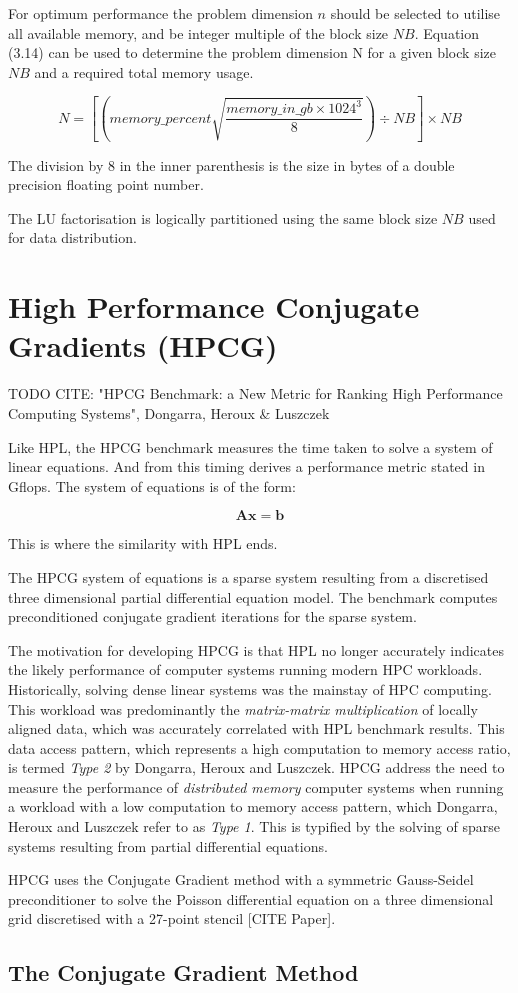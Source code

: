 For optimum performance the problem dimension $n$ should be selected to utilise all available memory, and be integer multiple of the block size $NB$. Equation (3.14) can be used to determine the problem dimension N for a given block size $NB$ and a required total memory usage.

\begin{equation}
N = \left[\left(memory\_percent \sqrt{\frac{memory\_in\_gb \times 1024^3}{8}}\right) \div NB\right] \times NB
\end{equation}

The division by 8 in the inner parenthesis is the size in bytes of a double precision floating point number.

The LU factorisation is logically partitioned using the same block size $NB$ used for data distribution.


%
%
\section{High Performance Conjugate Gradients (HPCG)}

TODO CITE: "HPCG Benchmark: a New Metric for Ranking High Performance Computing Systems", Dongarra, Heroux \& Luszczek

Like HPL, the HPCG benchmark measures the time taken to solve a system of linear equations. And from this timing derives a performance metric stated in Gflops. The system of equations is of the form:

\begin{equation}
\mathbf{Ax} = \mathbf{b}
\end{equation}

This is where the similarity with HPL ends.

The HPCG system of equations is a sparse system resulting from a discretised three dimensional partial differential equation model. The benchmark computes preconditioned conjugate gradient iterations for the sparse system.

The motivation for developing HPCG is that HPL no longer accurately indicates the likely performance of computer systems running modern HPC workloads. Historically, solving dense linear systems was the mainstay of HPC computing. This workload was predominantly the \emph{matrix-matrix multiplication} of locally aligned data, which was accurately correlated with HPL benchmark results. This data access pattern, which represents a high computation to memory access ratio, is termed \emph{Type 2} by Dongarra, Heroux and Luszczek. HPCG address the need to measure the performance of \emph{distributed memory} computer systems when running a workload with a low computation to memory access pattern, which Dongarra, Heroux and Luszczek refer to as \emph{Type 1}. This is typified by the solving of sparse systems resulting from partial differential equations.

HPCG uses the Conjugate Gradient method with a symmetric Gauss-Seidel preconditioner to solve the Poisson differential equation on a three dimensional grid discretised with a 27-point stencil [CITE Paper].


%
%
\subsection{The Conjugate Gradient Method}







